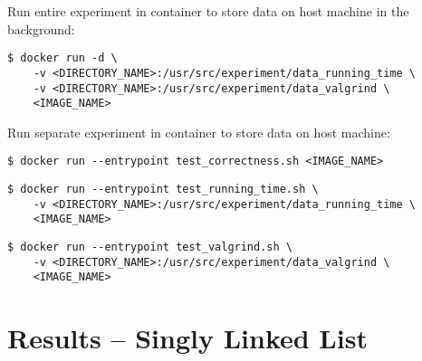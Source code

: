 \documentclass[a4paper,11pt]{kth-mag}
\newcommand*{\skippara}{\par\vspace{\baselineskip} \noindent}
\begin{document}
\skippara Run entire experiment in container to store data on host machine in the background:
\begin{lstlisting}[basicstyle=\ttfamily, frame=single]
$ docker run -d \
    -v <DIRECTORY_NAME>:/usr/src/experiment/data_running_time \
    -v <DIRECTORY_NAME>:/usr/src/experiment/data_valgrind \
    <IMAGE_NAME>
\end{lstlisting}

\skippara Run separate experiment in container to store data on host machine:
\begin{lstlisting}[basicstyle=\ttfamily, frame=single]
$ docker run --entrypoint test_correctness.sh <IMAGE_NAME>
\end{lstlisting}
\begin{lstlisting}[basicstyle=\ttfamily, frame=single]
$ docker run --entrypoint test_running_time.sh \
    -v <DIRECTORY_NAME>:/usr/src/experiment/data_running_time \
    <IMAGE_NAME>
\end{lstlisting}
\begin{lstlisting}[basicstyle=\ttfamily, frame=single]
$ docker run --entrypoint test_valgrind.sh \
    -v <DIRECTORY_NAME>:/usr/src/experiment/data_valgrind \
    <IMAGE_NAME>
\end{lstlisting}

\chapter{Results -- Singly Linked List}\label{app:singly}
\end{document}
